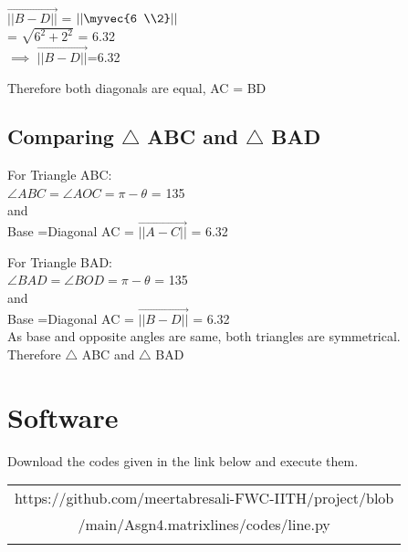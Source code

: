 \documentclass[journal,10pt,twocolumn]{article}
\begin{document}
$\vec{||B-D||}$ =  $||\myvec{6 \\2}||$
	\\
\vspace{0.25cm}
= $\sqrt{6^2+2^2}$ = 6.32\\
\vspace{0.25cm}
$\implies$ $\vec{||B-D||}$=6.32\\
\begin{flushleft}
Therefore both diagonals are equal,  AC = BD \\
\end{flushleft}

\subsection{Comparing $\triangle$ ABC and $\triangle$ BAD }
\begin{flushleft}
\vspace{0.25cm}
For Triangle ABC:\\
\vspace{0.25cm}
$\angle ABC = \angle AOC = \pi -\theta$ = 135 \textdegree \\
\vspace{0.25cm}
and\\
\vspace{0.25cm}
Base =Diagonal AC  = $\vec{||A-C||}$ = 6.32\\
\vspace{0.35cm}

For Triangle BAD:\\
\vspace{0.25cm}
$\angle BAD = \angle BOD = \pi -\theta$ = 135 \textdegree \\
\vspace{0.25cm}
and\\
\vspace{0.25cm}
Base =Diagonal AC  = $\vec{||B-D||} $ = 6.32\\
\vspace{0.35cm}
As base and opposite angles are same, both triangles are symmetrical.
\vspace{0.25cm}\\
Therefore  $\triangle$ ABC and $\triangle$ BAD
\end{flushleft}

\section{Software}
\centering
Download the codes given in the link below and execute them.\\
\begin{table}[h]
\centering
\begin{tabular}{|c|} \hline
\rule{0pt}{10pt} 
https://github.com/meertabresali-FWC-IITH/project/blob \\
/main/Asgn4.matrixlines/codes/line.py\\
\\\hline
 \end{tabular}
\end{table}
\end{document}

